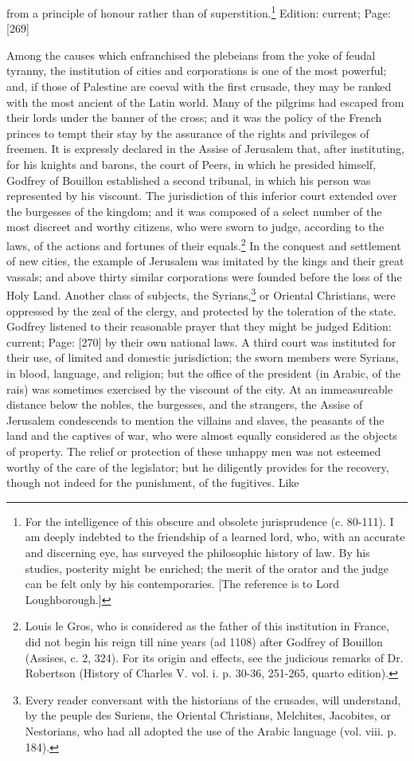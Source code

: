 from a principle of honour rather than of superstition.\footnote{For the intelligence of this obscure and obsolete jurisprudence (c. 80-111). I am deeply indebted to the friendship of a learned lord, who, with an accurate and discerning eye, has surveyed the philosophic history of law. By his studies, posterity might be enriched; the merit of the orator and the judge can be felt only by his contemporaries. [The reference is to Lord Loughborough.]}
Edition: current; Page: [269]

Among the causes which enfranchised the plebeians from the yoke of feudal tyranny, the institution of cities and corporations is one of the most powerful; and, if those of Palestine are coeval with the first crusade, they may be ranked with the most ancient of the Latin world. Many of the pilgrims had escaped from their lords under the banner of the cross; and it was the policy of the French princes to tempt their stay by the assurance of the rights and privileges of freemen. It is expressly declared in the Assise of Jerusalem that, after instituting, for his knights and barons, the court of Peers, in which he presided himself, Godfrey of Bouillon established a second tribunal, in which his person was represented by his viscount. The jurisdiction of this inferior court extended over the burgesses of the kingdom; and it was composed of a select number of the most discreet and worthy citizens, who were sworn to judge, according to the laws, of the actions and fortunes of their equals.\footnote{Louis le Gros, who is considered as the father of this institution in France, did not begin his reign till nine years (ad 1108) after Godfrey of Bouillon (Assises, c. 2, 324). For its origin and effects, see the judicious remarks of Dr. Robertson (History of Charles V. vol. i. p. 30-36, 251-265, quarto edition).} In the conquest and settlement of new cities, the example of Jerusalem was imitated by the kings and their great vassals; and above thirty similar corporations were founded before the loss of the Holy Land. Another class of subjects, the Syrians,\footnote{Every reader conversant with the historians of the crusades, will understand, by the peuple des Suriens, the Oriental Christians, Melchites, Jacobites, or Nestorians, who had all adopted the use of the Arabic language (vol. viii. p. 184).} or Oriental Christians, were oppressed by the zeal of the clergy, and protected by the toleration of the state. Godfrey listened to their reasonable prayer that they might be judged Edition: current; Page: [270] by their own national laws. A third court was instituted for their use, of limited and domestic jurisdiction; the sworn members were Syrians, in blood, language, and religion; but the office of the president (in Arabic, of the rais) was sometimes exercised by the viscount of the city. At an immeasureable distance below the nobles, the burgesses, and the strangers, the Assise of Jerusalem condescends to mention the villains and slaves, the peasants of the land and the captives of war, who were almost equally considered as the objects of property. The relief or protection of these unhappy men was not esteemed worthy of the care of the legislator; but he diligently provides for the recovery, though not indeed for the punishment, of the fugitives. Like 
